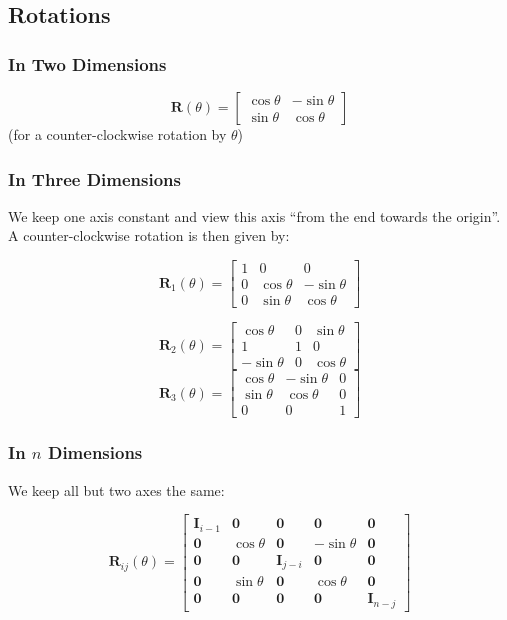 \documentclass[10pt,twoside,twocolumn]{article}
\begin{document}
\subsection{Rotations}


\subsubsection{In Two Dimensions}

\[
\mathbf{R}\left(\theta\right)=\left[\begin{array}{cc}
\cos\theta & -\sin\theta\\
\sin\theta & \cos\theta
\end{array}\right]
\]
(for a counter-clockwise rotation by $\theta$)


\subsubsection{In Three Dimensions}

We keep one axis constant and view this axis ``from the end towards
the origin''. A counter-clockwise rotation is then given by:

\[
\mathbf{R}_{1}\left(\theta\right)=\left[\begin{array}{ccc}
1 & 0 & 0\\
0 & \cos\theta & -\sin\theta\\
0 & \sin\theta & \cos\theta
\end{array}\right]
\]


\[
\mathbf{R}_{2}\left(\theta\right)=\left[\begin{array}{ccc}
\cos\theta & 0 & \sin\theta\\
1 & 1 & 0\\
-\sin\theta & 0 & \cos\theta
\end{array}\right]
\]
\[
\mathbf{R}_{3}\left(\theta\right)=\left[\begin{array}{ccc}
\cos\theta & -\sin\theta & 0\\
\sin\theta & \cos\theta & 0\\
0 & 0 & 1
\end{array}\right]
\]



\subsubsection{In $n$ Dimensions}

We keep all but two axes the same:

\[
\mathbf{R}_{ij}\left(\theta\right)=\left[\begin{array}{ccccc}
\mathbf{I}_{i-1} & \mathbf{0} & \mathbf{0} & \mathbf{0} & \mathbf{0}\\
\mathbf{0} & \cos\theta & \mathbf{0} & -\sin\theta & \mathbf{0}\\
\mathbf{0} & \mathbf{0} & \mathbf{I}_{j-i} & \mathbf{0} & \mathbf{0}\\
\mathbf{0} & \sin\theta & \mathbf{0} & \cos\theta & \mathbf{0}\\
\mathbf{0} & \mathbf{0} & \mathbf{0} & \mathbf{0} & \mathbf{I}_{n-j}
\end{array}\right]
\]
\end{document}
